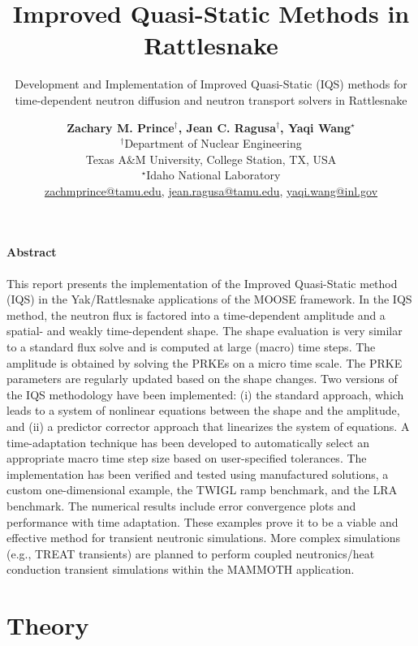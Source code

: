 \documentclass[12pt]{scrartcl}
\title{Improved Quasi-Static Methods in Rattlesnake}
\subtitle{Development and Implementation of Improved Quasi-Static (IQS) methods for time-dependent neutron diffusion and neutron transport solvers in Rattlesnake}
\author{ \normalsize
  \textbf{Zachary M. Prince$^\dagger$, Jean C. Ragusa$^\dagger$, Yaqi Wang$^\star$} \\
 \normalsize $^\dagger$Department of Nuclear Engineering \\
 \normalsize Texas A\&M University, College Station, TX, USA\\
 \normalsize $^\star$Idaho National Laboratory\\
 \normalsize \href{mailto:zachmprince@tamu.edu}{zachmprince@tamu.edu}, \href{jean.ragusa@tamu.edu}{jean.ragusa@tamu.edu}, \href{yaqi.wang@inl.gov}{yaqi.wang@inl.gov} 
}
\begin{document}
\maketitle
{}

\paragraph*{Abstract}

This report presents  the implementation of the Improved Quasi-Static method (IQS) in the Yak/Rattlesnake applications of the MOOSE framework.  In the IQS method, the neutron flux is factored into a time-dependent amplitude and a spatial- and weakly time-dependent shape.  The shape evaluation is very similar to a standard flux solve and is computed at large (macro) time steps. The amplitude is obtained by solving the PRKEs on a micro time scale. The PRKE parameters are regularly updated based on the shape changes.  Two versions of the IQS methodology have been implemented: (i) the standard approach, which leads to a system of nonlinear equations between the shape and the amplitude, and (ii) a predictor corrector approach that linearizes the system of equations. A time-adaptation technique has been developed to automatically select an appropriate macro time step size based on user-specified tolerances. The implementation has been verified and tested using manufactured solutions, a custom one-dimensional example, the TWIGL ramp benchmark, and the LRA benchmark.  The numerical results include error convergence plots and performance with time adaptation.  These examples prove it to be a viable and effective method for  transient neutronic simulations. More complex simulations (e.g., TREAT transients) are planned to perform coupled neutronics/heat conduction transient simulations within the MAMMOTH application.

\pagebreak

\section{Theory}
\end{document}
